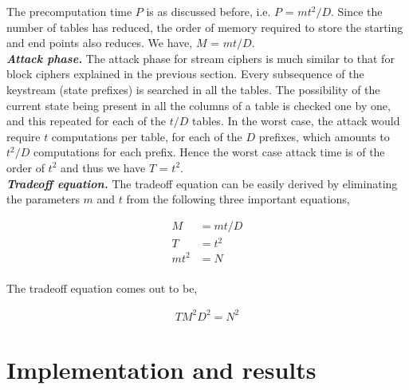 The precomputation time $P$ is as discussed before, i.e. $P$ = $mt^2/D$. Since the number of tables has reduced, the order of memory required to store the starting and end points also reduces. We have, $M$ = $mt/D$.\\

\noindent \textit{\textbf{Attack phase.}} The attack phase for stream ciphers is much similar to that for block ciphers explained in the previous section. Every subsequence of the keystream (state prefixes) is searched in all the tables. The possibility of the current state being present in all the columns of a table is checked one by one, and this repeated for each of the $t/D$ tables. In the worst case, the attack would require $t$ computations per table, for each of the $D$ prefixes, which amounts to $t^2/D$ computations for each prefix. Hence the worst case attack time is of the order of $t^2$ and thus we have $T$ = $t^2$.\\

\noindent \textit{\textbf{Tradeoff equation.}} The tradeoff equation can be easily derived by eliminating the parameters $m$ and $t$ from the following three important equations,

\begin{align*}
M &= mt/D\\
T &= t^2\\
mt^2 &= N\\
\end{align*}

The tradeoff equation comes out to be,

\begin{align}
\label{eq:tmdto-hellman-stream} TM^2D^2 = N^2
\end{align}

\section{Implementation and results}


	

